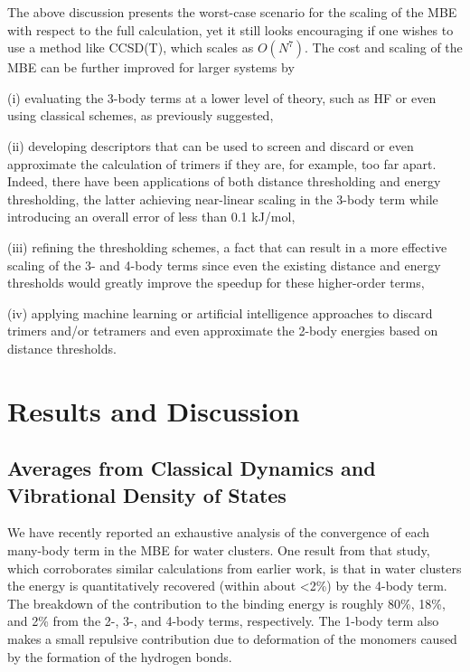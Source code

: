 \documentclass[11pt, proquest]{uwthesis}[2020/02/24]
\begin{document}
\par The above discussion presents the worst-case scenario for the scaling of the MBE with respect to the full calculation, yet it still looks encouraging if one wishes to use a method like CCSD(T), which scales as $O(N^7)$. The cost and scaling of the MBE can be further improved for larger systems by 
\par (i) evaluating the 3-body terms at a lower level of theory, such as HF or even using classical schemes, as previously suggested\autocite{heindel_many-body_2020},
\par (ii) developing descriptors that can be used to screen and discard or even approximate the calculation of trimers if they are, for example, too far apart. Indeed, there have been applications of both distance thresholding\autocite{cui_theoretical_2006} and energy thresholding,\cite{liu_energy-screened_2019} the latter achieving near-linear scaling in the 3-body term while introducing an overall error of less than 0.1 kJ/mol,
\par (iii) refining the thresholding schemes, a fact that can result in a more effective scaling of the 3- and 4-body terms since even the existing distance and energy thresholds would greatly improve the speedup for these higher-order terms,
\par (iv) applying machine learning or artificial intelligence approaches to discard trimers and/or tetramers and even approximate the 2-body energies based on distance thresholds.

\section{Results and Discussion}
\subsection{Averages from Classical Dynamics and Vibrational Density of States}
\par We have recently reported an exhaustive analysis of the convergence of each many-body term in the MBE for water clusters.\autocite{heindel_many-body_2020} One result from that study, which corroborates similar calculations from earlier work,\autocite{lao_understanding_2016} is that in water clusters the energy is quantitatively recovered (within about \textless2\%) by the 4-body term. The breakdown of the contribution to the binding energy is roughly 80\%, 18\%, and 2\% from the 2-, 3-, and 4-body terms, respectively. The 1-body term also makes a small repulsive contribution due to deformation of the monomers caused by the formation of the hydrogen bonds.
\end{document}
